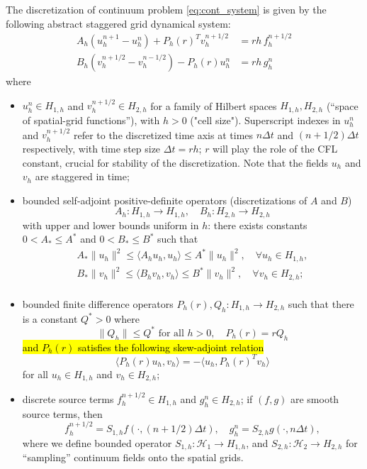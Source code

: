 The discretization of continuum problem \ref{eq:cont_system} is given by the following abstract staggered grid dynamical system:
\begin{equation}\label{eq:sg}
\begin{split}
	A_h(u^{n+1}_h - u^n_h)  + P_h(r)^T v^{n+1/2}_h &= rh\,   f_h^{n+1/2} \\
	B_h(v^{n+1/2}_h-v^{n-1/2}_h) -  P_h(r) u^n_h &=  rh\, g_h^{n} 
\end{split}
\end{equation}
where
\begin{itemize} 
	\item $u_h^n\in H_{1,h}$ and $v_h^{n+1/2}\in H_{2,h}$
	for a 	family of Hilbert spaces $H_{1,h}, H_{2,h}$ (``space of spatial-grid functions''), with $h>0$ ("cell size"). Superscript indexes in $u_h^{n}$ and $v_h^{n+1/2}$ refer to the discretized time axis at times $n\Delta t$ and $(n+1/2)\Delta t$ respectively, with time step size $\Delta t = rh$; $r$ will play the role of the CFL constant, crucial for stability of the discretization. Note that the fields $u_h$ and $v_h$ are staggered in time;

	\item bounded self-adjoint positive-definite operators (discretizations of $A$ and $B$)
\[
	A_h: H_{1,h} \rightarrow H_{1,h},\quad B_h: H_{2,h} \rightarrow H_{2,h}
\]
with upper and lower bounds uniform in $h$: there exists constants $0<A_*\le A^*$ and $0<B_*\le B^*$ such that
\begin{equation*}
\begin{split}
	A_*\|u_h\|^2 \le \langle A_h u_h,u_h \rangle \le A^*\|u_h\|^2, 
	\quad \forall u_h\in H_{1,h}, \\
	B_*\|v_h\|^2 \le \langle B_h v_h,v_h \rangle \le B^*\|v_h\|^2,
	\quad \forall v_h\in H_{2,h}; \\
\end{split}
\end{equation*}
\item bounded finite difference operators $P_h(r), Q_h:H_{1,h} \rightarrow H_{2,h}$ such that there is a constant $Q^*>0$ where
\[
	\|Q_h\| \le Q^* \mbox{ for all } h>0,  \quad P_h(r) = rQ_h
\]
\hl{and $P_h(r)$ satisfies the following skew-adjoint relation}
\begin{equation}\label{eq:skew_h}
	\langle P_h(r) u_h, v_h \rangle = - \langle u_h, P_h(r)^T v_h\rangle
\end{equation}
for all $u_h\in H_{1,h}$ and $v_h\in H_{2,h}$;
\item discrete source terms $f_h^{n+1/2}\in H_{1,h}$ and $g_h^n\in H_{2,h}$; if $(f,g)$ are smooth source terms, then
\[
	f_h^{n+1/2} = S_{1,h} f(\cdot,(n+1/2)\Delta t), \quad g_h^n = S_{2,h} g(\cdot,n\Delta t),
\]
where we define bounded operator $S_{1,h}:\mathcal H_1\to H_{1,h}$, and $S_{2,h}:\mathcal H_2\to H_{2,h}$ for ``sampling'' continuum fields onto the spatial grids.
\end{itemize} 


